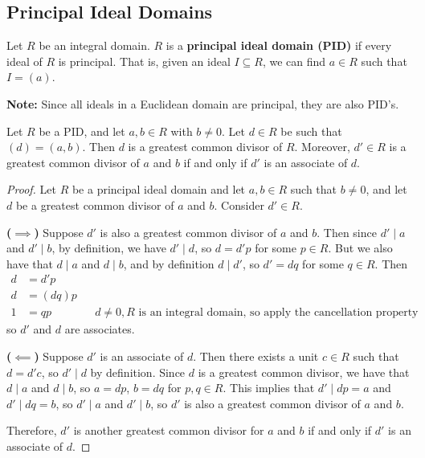 \documentclass [12pt] {article}
\newenvironment{definition}[1]{\begin{tcolorbox}[title={Definition: #1},colback=blue!5!white,colframe=black!75!blue]}{\end{tcolorbox}}
\newenvironment{theorem}[1]{\begin{tcolorbox}[title={Theorem #1},colback=green!5!white,colframe=black!75!green]}{\end{tcolorbox}}
\renewcommand{\bf}[1]{\textbf{{#1}}}
\begin{document}
\newpage
\subsection{Principal Ideal Domains}
\begin{definition}{Principal Ideal Domain (PID)}
    Let $R$ be an integral domain. $R$ is a \bf{principal ideal domain (PID)} if every ideal of $R$
    is principal. That is, given an ideal $I \subseteq R$, we can find $a \in R$ such that $I = (a)$.
\end{definition}
\bf{Note:} Since all ideals in a Euclidean domain are principal, they are also PID's.

\begin{theorem}{}
    Let $R$ be a PID, and let $a, b \in R$ with $b \neq 0$. Let $d \in R$ be such that
    $(d) = (a, b)$. Then $d$ is a greatest common divisor of $R$. Moreover, $d' \in R$ is a
    greatest common divisor of $a$ and $b$ if and only if $d'$ is an associate of $d$.
\end{theorem}
\begin{proof}
    Let $R$ be a principal ideal domain and let $a, b \in R$ such that $b \neq 0$, and let
    $d$ be a greatest common divisor of $a$ and $b$. Consider $d' \in R$.
    \vspace{0.5em}

    \bf{($\bm{\implies}$)}
    Suppose $d'$ is also a greatest common divisor of $a$ and $b$. Then since $d' \mid a$ and
    $d' \mid b$, by definition, we have $d' \mid d$, so $d = d'p$ for some $p \in R$. But we also
    have that $d \mid a$ and $d \mid b$, and by definition $d \mid d'$, so $d' = dq$ for some
    $q \in R$. Then
    \begin{align*}
        d &= d'p \\
        d &= (dq)p \\
        1 &= qp && d \neq 0, R \text{ is an integral domain, so apply the cancellation property}
    \end{align*}
    so $d'$ and $d$ are associates.
    \vspace{0.5em}

    \bf{($\bm{\impliedby}$)}
    Suppose $d'$ is an associate of $d$. Then there exists a unit $c \in R$ such that $d = d'c$,
    so $d' \mid d$ by definition. Since $d$ is a greatest common divisor, we have that $d \mid a$
    and $d \mid b$, so $a = dp$, $b = dq$ for $p, q \in R$. This implies that $d' \mid dp = a$ and
    $d' \mid dq = b$, so $d' \mid a$ and $d' \mid b$, so $d'$ is also a greatest common divisor of
    $a$ and $b$.
    \vspace{0.5em}

    Therefore, $d'$ is another greatest common divisor for $a$ and $b$ if and only if $d'$ is an
    associate of $d$.
\end{proof}
\end{document}
